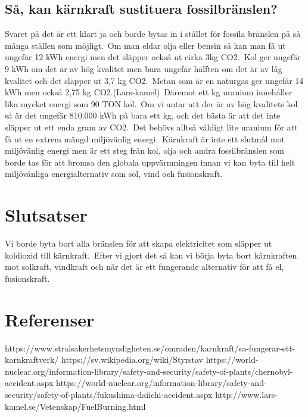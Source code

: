 \documentclass[11p]{article}
\begin{document}
    \subsection{Så, kan kärnkraft sustituera fossilbränslen?}
    Svaret på det är ett klart ja och borde bytas in i stället för fossila bränslen på så många ställen som möjligt.\
    Om man eldar olja eller bensin så kan man få ut ungefär 12 kWh energi men det släpper också ut cirka 3kg CO2.\
    Kol ger ungefär 9 kWh om det är av hög kvalitet men bara ungefär hälften om det är av låg kvalitet och det släpper ut 3,7 kg CO2.\
    Metan som är en naturgas ger ungefär 14 kWh men också 2,75 kg CO2.(Lars-kamel)\
    Däremot ett kg uranium innehåller lika mycket energi som 90 TON kol.\ Om vi antar att der är av hög kvalitets kol
    så är det ungefär 810.000 kWh på bara ett kg, och det bästa är att det inte släpper ut ett enda gram av CO2.\
    Det behövs alltså väldigt lite uranium för att få ut en extrem mängd miljövänlig energi.\ Kärnkraft är inte
    ett slutmål mot miljövänlig energi men är ett steg från kol, olja och andra fossilbränslen som borde tas
    för att bromsa den globala uppvärmningen innan vi kan byta till helt miljövänliga energialternativ som sol, vind och fusionskraft.\

    \section{Slutsatser}
    Vi borde byta bort alla bränslen för att skapa elektricitet som släpper ut koldioxid till kärnkraft.\ Efter vi gjort det så kan vi
    börja byta bort kärnkraften mot solkraft, vindkraft och när det är ett fungerande alternativ för att få el, fusionskraft.\


    \section{Referenser}
    https://www.stralsakerhetsmyndigheten.se/omraden/karnkraft/sa-fungerar-ett-karnkraftverk/
    https://sv.wikipedia.org/wiki/Styrstav
    \vspace{0.5cm}
    https://world-nuclear.org/information-library/safety-and-security/safety-of-plants/chernobyl-accident.aspx
    https://world-nuclear.org/information-library/safety-and-security/safety-of-plants/fukushima-daiichi-accident.aspx
    \vspace{0.5cm}
    http://www.lars-kamel.se/Vetenskap/FuelBurning.html
\end{document}

